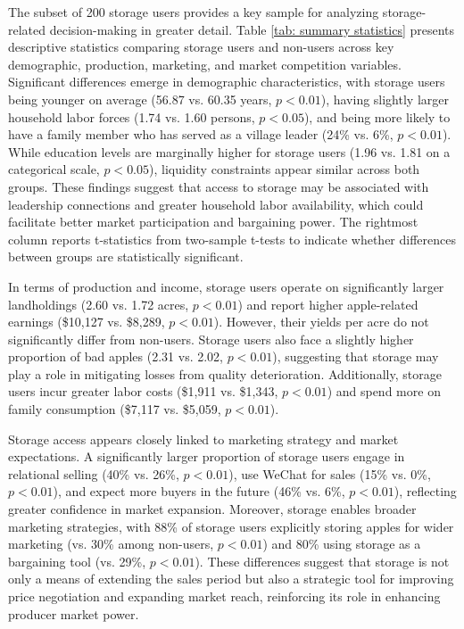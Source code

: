 

The subset of 200 storage users provides a key sample for analyzing storage-related decision-making in greater detail. Table \ref{tab: summary statistics} presents descriptive statistics comparing storage users and non-users across key demographic, production, marketing, and market competition variables. Significant differences emerge in demographic characteristics, with storage users being younger on average (56.87 vs. 60.35 years, $p < 0.01$), having slightly larger household labor forces (1.74 vs. 1.60 persons, $p < 0.05$), and being more likely to have a family member who has served as a village leader (24\% vs. 6\%, $p < 0.01$). While education levels are marginally higher for storage users (1.96 vs. 1.81 on a categorical scale, $p < 0.05$), liquidity constraints appear similar across both groups. These findings suggest that access to storage may be associated with leadership connections and greater household labor availability, which could facilitate better market participation and bargaining power. The rightmost column reports t-statistics from two-sample t-tests to indicate whether differences between groups are statistically significant.  

In terms of production and income, storage users operate on significantly larger landholdings (2.60 vs. 1.72 acres, $p < 0.01$) and report higher apple-related earnings (\$10,127 vs. \$8,289, $p < 0.01$). However, their yields per acre do not significantly differ from non-users. Storage users also face a slightly higher proportion of bad apples (2.31 vs. 2.02, $p < 0.01$), suggesting that storage may play a role in mitigating losses from quality deterioration. Additionally, storage users incur greater labor costs (\$1,911 vs. \$1,343, $p < 0.01$) and spend more on family consumption (\$7,117 vs. \$5,059, $p < 0.01$).  

Storage access appears closely linked to marketing strategy and market expectations. A significantly larger proportion of storage users engage in relational selling (40\% vs. 26\%, $p < 0.01$), use WeChat for sales (15\% vs. 0\%, $p < 0.01$), and expect more buyers in the future (46\% vs. 6\%, $p < 0.01$), reflecting greater confidence in market expansion. Moreover, storage enables broader marketing strategies, with 88\% of storage users explicitly storing apples for wider marketing (vs. 30\% among non-users, $p < 0.01$) and 80\% using storage as a bargaining tool (vs. 29\%, $p < 0.01$). These differences suggest that storage is not only a means of extending the sales period but also a strategic tool for improving price negotiation and expanding market reach, reinforcing its role in enhancing producer market power.  

